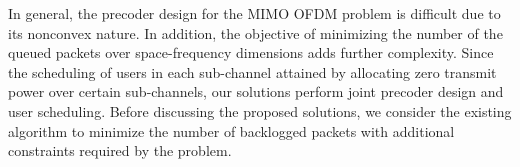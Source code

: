 In general, the precoder design for the \ac{MIMO} \ac{OFDM} problem is difficult due to its nonconvex nature. In addition, the objective of minimizing the number of the queued packets over space-frequency dimensions adds further complexity. Since the scheduling of users in each sub-channel attained by allocating zero transmit power over certain sub-channels, our solutions perform joint precoder design and user scheduling. Before discussing the proposed solutions, we consider the existing algorithm to minimize the number of backlogged packets with additional constraints required by the problem.